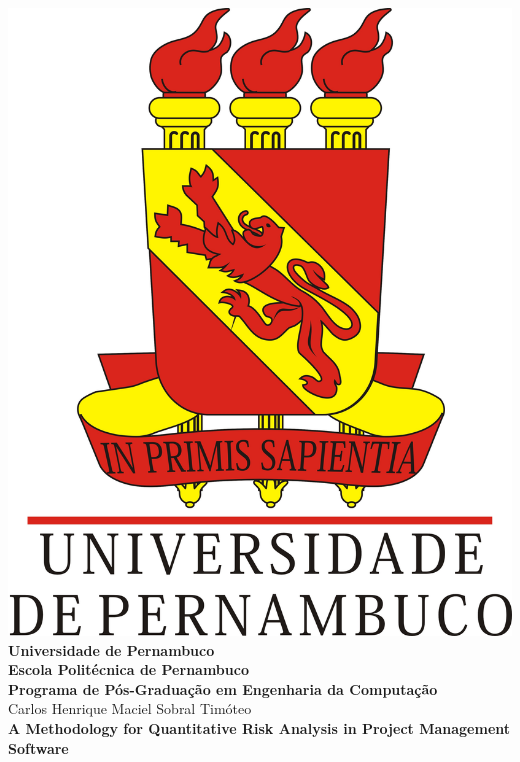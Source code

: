 \begin{titlepage}
  \begin{center}
	\includegraphics[scale=0.17]{image/UPE_brasao}\\
	\textbf{Universidade de Pernambuco}\\
	\textbf{Escola Politécnica de Pernambuco}\\
    \textbf{Programa de Pós-Graduação em Engenharia da Computação}\\[3cm]

    Carlos Henrique Maciel Sobral Timóteo\\[2cm]
{
\Large
    \textbf{A Methodology for Quantitative Risk Analysis in Project Management Software}\\[2cm]
}
  \end{center}

\noindent{}


\end{titlepage}
